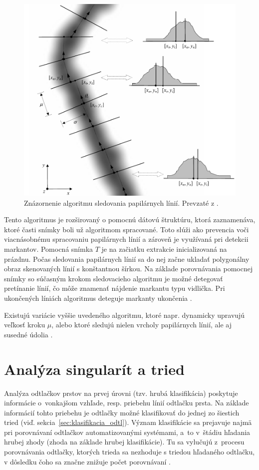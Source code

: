   \begin{figure}[h]
    \centering
    \includegraphics[width=0.65\linewidth]{obrazky-figures/ridge_following-maltoni.png}
    \caption{Znázornenie algoritmu sledovania papilárnych línií. Prevzaté z \cite{Handbook}.}
    \label{obr:sledovanie_linii}
  \end{figure}

  Tento algoritmus je rozširovaný o pomocnú dátovú štruktúru, ktorá zaznamenáva, ktoré časti snímky boli už algoritmom spracované. Toto slúži
  ako prevencia voči viacnásobnému spracovaniu papilárnych línií a zároveň je využívaná pri detekcii markantov. Pomocná snímka $T$ je na začiatku
  extrakcie inicializovaná na prázdnu. Počas sledovania papilárnych línií sa do nej začne ukladať polygonálny obraz skenovaných línií s konštantnou šírkou.
  Na základe porovnávania pomocnej snímky so súčasným krokom sledovacieho algoritmu je možné detegovať pretínanie línií, čo môže znamenať nájdenie markantu
  typu vidlička. Pri ukončených líniách algoritmus deteguje markanty ukončenia \cite{maio1997ridge_following}.

  Existujú variácie vyššie uvedeného algoritmu, ktoré napr. dynamicky upravujú veľkosť kroku $\mu$, alebo ktoré sledujú nielen vrcholy papilárnych línií,
  ale aj susedné údolia \cite{Handbook}.

  \section{Analýza singularít a tried}
  Analýza odtlačkov prstov na prvej úrovni (tzv. hrubá klasifikácia) poskytuje informácie o~vonkajšom vzhľade, resp. priebehu línií odtlačku prsta.
  Na základe informácií tohto priebehu je odtlačky možné klasifikovať do jednej zo šiestich tried (viď. sekcia~{\ref{sec:klasifikacia_odtl}}). Význam
  klasifikácie sa prejavuje najmä pri porovnávaní odtlačkov automatizovanými systémami, a~to v~štádiu hľadania hrubej zhody (zhoda na základe hrubej
  klasifikácie). Tu sa vylučujú z~procesu porovnávania odtlačky, ktorých trieda sa nezhoduje s triedou hľadaného odtlačku, v dôsledku čoho sa značne znižuje
  počet porovnávaní \cite{karu1996classification, Handbook}.

